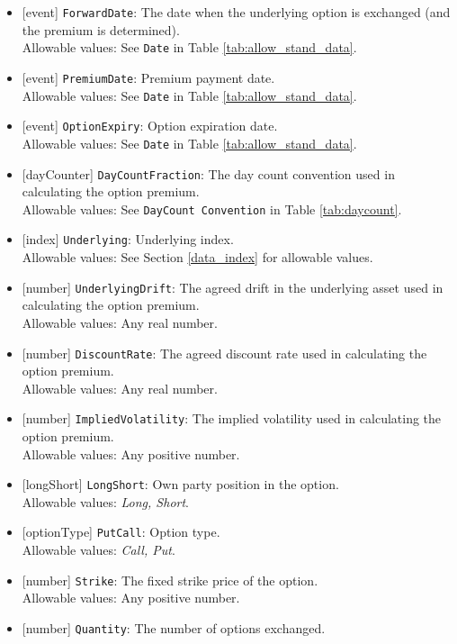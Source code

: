 \begin{itemize}
  \item{}[event] \lstinline!ForwardDate!: The date when the underlying option is exchanged (and the premium is determined). \\
  Allowable values: See \lstinline!Date! in Table \ref{tab:allow_stand_data}.
  \item{}[event] \lstinline!PremiumDate!: Premium payment date. \\
  Allowable values: See \lstinline!Date! in Table \ref{tab:allow_stand_data}.
  \item{}[event] \lstinline!OptionExpiry!: Option expiration date. \\
  Allowable values: See \lstinline!Date! in Table \ref{tab:allow_stand_data}.
  \item{}[dayCounter] \lstinline!DayCountFraction!: The day count convention used in calculating the option premium. \\
  Allowable values: See \lstinline!DayCount Convention! in Table \ref{tab:daycount}.
  \item{}[index] \lstinline!Underlying!: Underlying index. \\
  Allowable values: See Section \ref{data_index} for allowable values.
  \item{}[number] \lstinline!UnderlyingDrift!: The agreed drift in the underlying asset used in calculating the option premium. \\
  Allowable values: Any real number.
  \item{}[number] \lstinline!DiscountRate!: The agreed discount rate used in calculating the option premium. \\
  Allowable values: Any real number.
  \item{}[number] \lstinline!ImpliedVolatility!: The implied volatility used in calculating the option premium. \\
  Allowable values: Any positive number.
  \item{}[longShort] \lstinline!LongShort!: Own party position in the option. \\
  Allowable values: \emph{Long, Short}.
  \item{}[optionType] \lstinline!PutCall!: Option type. \\
  Allowable values: \emph{Call, Put}.
  \item{}[number] \lstinline!Strike!: The fixed strike price of the option. \\
  Allowable values: Any positive number.
  \item{}[number] \lstinline!Quantity!: The number of options exchanged. \\

\end{itemize}
